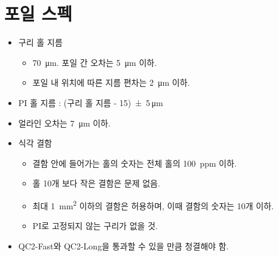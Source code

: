 \section{포일 스펙} \label{sec:spec}

\begin{itemize}
\item 구리 홀 지름
  \begin{itemize}
  \item \SI{70}{\micro\meter}. 포일 간 오차는 \SI{5}{\micro\meter} 이하.
  \item 포일 내 위치에 따른 지름 편차는 \SI{2}{\micro\meter} 이하.
  \end{itemize}
\item PI 홀 지름 : (구리 홀 지름 - 15)\num{ \pm 5}\,\si{\micro\meter}
\item 얼라인 오차는 \SI{7}{\micro\meter} 이하. 
\item 식각 결함
  \begin{itemize}
  \item 결함 안에 들어가는 홀의 숫자는 전체 홀의 \SI{100}{ppm} 이하.
  \item 홀 10개 보다 작은 결함은 문제 없음. 
  \item 최대 \SI{1}{\milli\meter\squared} 이하의 결함은 허용하며, 이때 결함의 숫자는 10개 이하.
  \item PI로 고정되지 않는 구리가 없을 것.
  \end{itemize}
\item QC2-Fast와 QC2-Long을 통과할 수 있을 만큼 청결해야 함.
\end{itemize}
